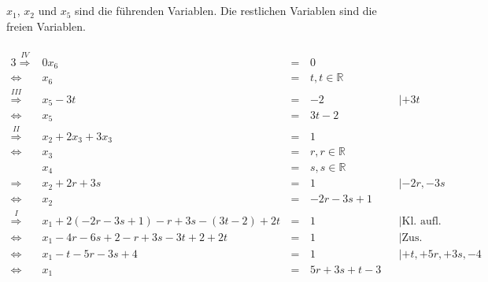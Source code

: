 \documentclass[10pt,a4paper,oneside,ngerman,numbers=noenddot]{scrartcl}
\begin{document}
\section{} %
$x_{1}$, $x_{2}$ und $x_{5}$ sind die führenden Variablen. Die restlichen Variablen sind die freien Variablen.
\\
\\
\begin{alignat*}{3}
\overset{IV}{\Rightarrow} & 0x_{6} &\,=\,& 0 && \\
\Leftrightarrow & x_{6} &\,=\,& t, t \in \mathbb{R} \\
\overset{III}{\Rightarrow} & x_{5} - 3t &\,=\,& -2 && | + 3t \\
\Leftrightarrow & x_{5} &\,=\,& 3t - 2 & \\
\overset{II}{\Rightarrow} & x_{2} + 2x_{3} + 3x_{3} &\,=\,& 1 && \\
\Leftrightarrow & x_{3} &\,=\,& r, r \in \mathbb{R} & \\
& x_{4} &\,=\,& s, s \in \mathbb{R} && \\
\Rightarrow & x_{2} + 2r + 3s &\,=\,& 1 && | -2r, -3s \\
\Leftrightarrow & x_{2} &\,=\,& -2r - 3s + 1 && \\
\overset{I}{\Rightarrow} & x_{1} + 2(-2r - 3s + 1) - r + 3s - (3t - 2) + 2t &\,=\,& 1 && | \text{Kl. aufl.} \\
\Leftrightarrow & x_{1} - 4r - 6s + 2 - r + 3s -3t + 2 + 2t &\,=\,& 1 && | \text{Zus.} \\
\Leftrightarrow & x_{1} - t - 5r - 3s + 4 &\,=\,& 1 && | +t, +5r, +3s, -4 \\
\Leftrightarrow & x_{1} &\,=\,& 5r + 3s + t - 3 &&
\end{alignat*}
\end{document}
